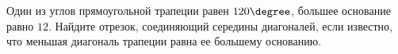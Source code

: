 \begin{ex}
	\begin{condition}
		Один из углов прямоугольной трапеции равен \( 120\degree \), большее основание равно \( 12 \). Найдите отрезок, соединяющий	середины диагоналей, если известно, что меньшая диагональ трапеции равна ее большему основанию.
	\end{condition}
\end{ex}